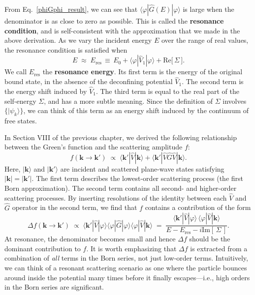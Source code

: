 \documentclass[pra,12pt]{revtex4}
\begin{document}
From Eq.~\eqref{phiGphi_result}, we can see that
$\langle\varphi|\hat{G}(E)|\varphi\rangle$ is large when the
denominator is as close to zero as possible.  This is called the
\textbf{resonance condition}, and is self-consistent with the
approximation that we made in the above derivation.  As we vary the
incident energy $E$ over the range of real values, the resonance
condition is satisfied when
\begin{equation}
  E \;\approx\; E_{\mathrm{res}} \,\equiv\, E_0 + \langle\varphi|\hat{V}_1|\varphi\rangle + \mathrm{Re}\big[\,\Sigma\,\big].
\end{equation}
We call $E_{\mathrm{res}}$ the \textbf{resonance energy}.  Its first
term is the energy of the original bound state, in the absence of the
deconfining potential $\hat{V}_1$.  The second term is the energy
shift induced by $\hat{V}_1$.  The third term is equal to the real
part of the self-energy $\Sigma$, and has a more subtle meaning.
Since the definition of $\Sigma$ involves $\{|\psi_k\rangle\}$, we can
think of this term as an energy shift induced by the continuum of free
states.

In Section VIII of the previous chapter, we derived the following
relationship between the Green's function and the scattering amplitude
$f$:
\begin{equation}
  f(\mathbf{k}\rightarrow\mathbf{k}') \;\propto\; \langle \mathbf{k}'|\hat{V}|\mathbf{k}\rangle + \langle \mathbf{k}'|\hat{V}\hat{G}\hat{V}|\mathbf{k}\rangle.
\end{equation}
Here, $|\mathbf{k}\rangle$ and $|\mathbf{k}'\rangle$ are incident and
scattered plane-wave states satisfying $|\mathbf{k}|=|\mathbf{k}'|$.
The first term describes the lowest-order scattering process (the
first Born approximation).  The second term contains all second- and
higher-order scattering processes.  By inserting resolutions of the
identity between each $\hat{V}$ and $\hat{G}$ operator in the second
term, we find that $f$ contains a contribution of the form
\begin{equation}
  \Delta f(\mathbf{k}\rightarrow\mathbf{k}') \;\propto\; \langle \mathbf{k}'|\hat{V}|\varphi\rangle\langle\varphi|\hat{G}|\varphi\rangle\langle\varphi|\hat{V}|\mathbf{k}\rangle \;=\; \frac{\langle \mathbf{k}'|\hat{V}|\varphi\rangle \, \langle\varphi|\hat{V}|\mathbf{k}\rangle}{\displaystyle E - E_{\mathrm{res}} - i \mathrm{Im}[\,\Sigma\,]}.
  \label{deltaf}
\end{equation}
At resonance, the denominator becomes small and hence $\Delta f$
should be the dominant contribution to $f$.  It is worth emphasizing
that $\Delta f$ is extracted from a combination of \textit{all} terms
in the Born series, not just low-order terms.  Intuitively, we can
think of a resonant scattering scenario as one where the particle
bounces around inside the potential many times before it finally
escapes---i.e., high orders in the Born series are significant.
\end{document}
